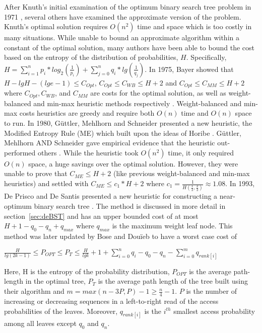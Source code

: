 \documentclass[letterpaper,12pt,titlepage,oneside,final]{book}
\theoremstyle{plain}
\begin{document}
After Knuth's initial examination of the optimum binary search tree problem in 1971 \cite{knuth1971optimum}, several others have examined the approximate version of the problem. Knuth's optimal solution requires $O(n^2)$ time and space which is too costly in many situations. While unable to bound an approximate algorithm within a constant of the optimal solution, many authors have been able to bound the cost based on the entropy of the distribution of probabilities, $H$. Specifically, $H = \sum_{i=1}^{n} p_i*log_2(\frac{1}{p_i}) + \sum_{j=0}^{n} q_i*lg(\frac{1}{q_j})$. In 1975, Bayer showed that $H-lg H-(lg e-1) \leq C_{Opt}$, $C_{Opt} \leq C_{WB} \leq H + 2$ and $C_{Opt} \leq C_{MM} \leq H + 2$ where $C_{Opt}, C_{WB}$, and $C_{MM}$ are costs for the optimal solution, as well as weight-balanced and min-max heuristic methods respectively \cite{bayer1975improved}. Weight-balanced and min-max costs heuristics are greedy and require both $O(n)$ time and $O(n)$ space to run. In 1980, G{\"u}ttler, Mehlhorn and Schneider presented a new heuristic, the Modified Entropy Rule (ME) \cite{guttler1980binary} which built upon the ideas of Horibe \cite{horibe1977improved}. G{\"u}ttler, Mehlhorn AND Schneider gave empirical evidence that the heuristic out-performed others \cite{guttler1980binary}. While the heuristic took $O(n^2)$ time, it only required $O(n)$ space, a huge savings over the optimal solution. However, they were unable to prove that $C_{ME} \leq H+2$ (like previous weight-balanced and min-max heuristics) and settled with $C_{ME} \leq c_1*H+2$ where $c_1=\frac{1}{H(\frac{1}{3}, \frac{2}{3})} \approx 1.08$. In 1993, De Prisco and De Santis presented a new heuristic for constructing a near-optimum binary search tree \cite{de1993binary}. The method is discussed in more detail in section~\ref{sec:deBST} and has an upper bounded cost of at most $H+1-q_0-q_n+q_{max}$ where $q_{max}$ is the maximum weight leaf node. This method was later updated by Bose and Dou\"{i}eb to have a worst case cost of 
 \begin{center}
$\frac{H}{lg(2k-1)} \leq P_{OPT} \leq P_T \leq \frac{H}{lg k} + 1 + \sum_{i=0}^n q_i - q_0 - q_n - \sum_{i=0}^m q_{rank[i]}$ \cite{bose2009efficient}
\end{center}
Here, H is the entropy of the probability distribution, $P_{OPT}$ is the average path-length in the optimal tree, $P_T$ is the average path length of the tree built using their algorithm and $m=max({n-3P,P})-1 \geq \frac{n}{4} - 1$. $P$ is the number of increasing or decreasing sequences in a left-to-right read of the access probabilities of the leaves. Moreover, $q_{rank[i]}$ is the $i^{th}$ smallest access probability among all leaves except $q_0$ and $q_n$. \\ 
 
\end{document}
